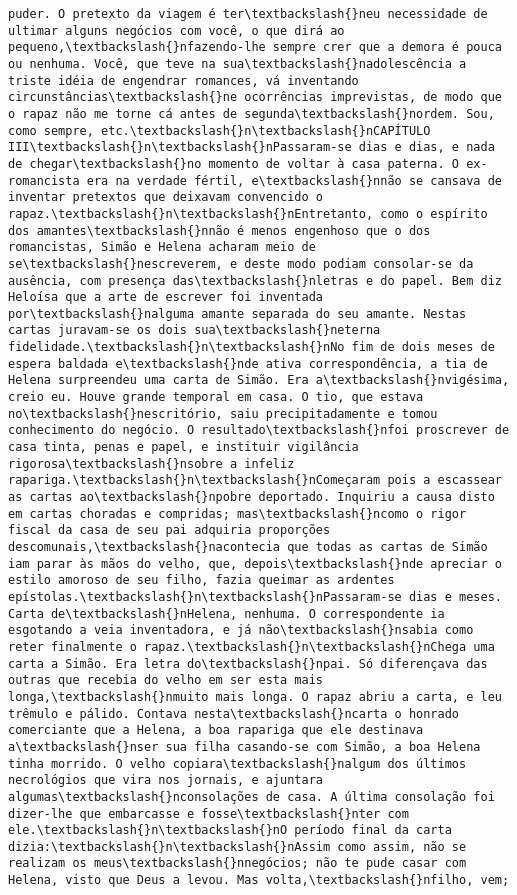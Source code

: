 \begin{Verbatim}[commandchars=\\\{\}]
puder. O pretexto da viagem é ter\textbackslash{}neu necessidade de ultimar alguns negócios com você, o que dirá ao pequeno,\textbackslash{}nfazendo-lhe sempre crer que a demora é pouca ou nenhuma. Você, que teve na sua\textbackslash{}nadolescência a triste idéia de engendrar romances, vá inventando circunstâncias\textbackslash{}ne ocorrências imprevistas, de modo que o rapaz não me torne cá antes de segunda\textbackslash{}nordem. Sou, como sempre, etc.\textbackslash{}n\textbackslash{}nCAPÍTULO III\textbackslash{}n\textbackslash{}nPassaram-se dias e dias, e nada de chegar\textbackslash{}no momento de voltar à casa paterna. O ex-romancista era na verdade fértil, e\textbackslash{}nnão se cansava de inventar pretextos que deixavam convencido o rapaz.\textbackslash{}n\textbackslash{}nEntretanto, como o espírito dos amantes\textbackslash{}nnão é menos engenhoso que o dos romancistas, Simão e Helena acharam meio de se\textbackslash{}nescreverem, e deste modo podiam consolar-se da ausência, com presença das\textbackslash{}nletras e do papel. Bem diz Heloísa que a arte de escrever foi inventada por\textbackslash{}nalguma amante separada do seu amante. Nestas cartas juravam-se os dois sua\textbackslash{}neterna fidelidade.\textbackslash{}n\textbackslash{}nNo fim de dois meses de espera baldada e\textbackslash{}nde ativa correspondência, a tia de Helena surpreendeu uma carta de Simão. Era a\textbackslash{}nvigésima, creio eu. Houve grande temporal em casa. O tio, que estava no\textbackslash{}nescritório, saiu precipitadamente e tomou conhecimento do negócio. O resultado\textbackslash{}nfoi proscrever de casa tinta, penas e papel, e instituir vigilância rigorosa\textbackslash{}nsobre a infeliz rapariga.\textbackslash{}n\textbackslash{}nComeçaram pois a escassear as cartas ao\textbackslash{}npobre deportado. Inquiriu a causa disto em cartas choradas e compridas; mas\textbackslash{}ncomo o rigor fiscal da casa de seu pai adquiria proporções descomunais,\textbackslash{}nacontecia que todas as cartas de Simão iam parar às mãos do velho, que, depois\textbackslash{}nde apreciar o estilo amoroso de seu filho, fazia queimar as ardentes epístolas.\textbackslash{}n\textbackslash{}nPassaram-se dias e meses. Carta de\textbackslash{}nHelena, nenhuma. O correspondente ia esgotando a veia inventadora, e já não\textbackslash{}nsabia como reter finalmente o rapaz.\textbackslash{}n\textbackslash{}nChega uma carta a Simão. Era letra do\textbackslash{}npai. Só diferençava das outras que recebia do velho em ser esta mais longa,\textbackslash{}nmuito mais longa. O rapaz abriu a carta, e leu trêmulo e pálido. Contava nesta\textbackslash{}ncarta o honrado comerciante que a Helena, a boa rapariga que ele destinava a\textbackslash{}nser sua filha casando-se com Simão, a boa Helena tinha morrido. O velho copiara\textbackslash{}nalgum dos últimos necrológios que vira nos jornais, e ajuntara algumas\textbackslash{}nconsolações de casa. A última consolação foi dizer-lhe que embarcasse e fosse\textbackslash{}nter com ele.\textbackslash{}n\textbackslash{}nO período final da carta dizia:\textbackslash{}n\textbackslash{}nAssim como assim, não se realizam os meus\textbackslash{}nnegócios; não te pude casar com Helena, visto que Deus a levou. Mas volta,\textbackslash{}nfilho, vem; 
\end{Verbatim}
